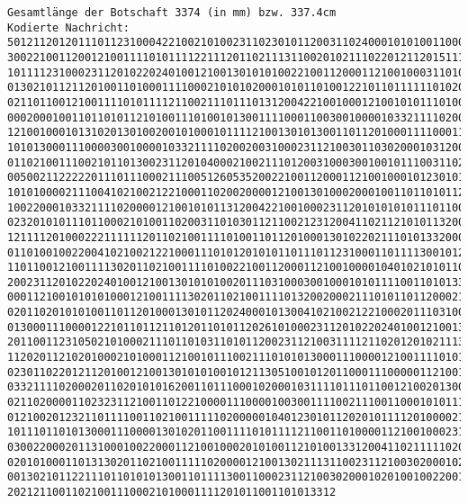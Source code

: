 \documentclass[a4paper,10pt,ngerman]{scrartcl}
\begin{document}
\begin{enumerate}
\begin{verbatim}
Gesamtlänge der Botschaft 3374 (in mm) bzw. 337.4cm
Kodierte Nachricht: 501211201201110112310004221002101002311023010112003110240001010100110002010100112101001
300221001120012100111101011112211120110211131100201021110220121120151111201013211111131
101111231000231120102202401001210013010101002210011200011210010003110101110101121102000
013021011211201001101000111100021010102000101011010012210110111111010200004100201121010
021101100121001111010111121100211101110131200422100100012100101011101001002200121001301
000200010011011010112101001110100101300111100011003001000010332111102003200110111130001
121001000101310201301002001010001011112100130101300110112010001111000110011010110121120
101013000111000030010000103321111020020031000231121003011030200010312004300101100200211
011021001110021011013002311201040002100211101200310003001001011100311024000101110030310
005002112222201110111000211100512605352002210011200011210010001012301012021102000012110
101010000211100410210021221000110200200001210013010002000100110110101121010011011201000
100220001033211110200001210010101131200422100100023112010101010111011001301040001020010
023201010111011000210100110200311010301121100212312004110211210101132001010111122111201
121111201000222111111201102100111101001101120100013010220211101013320002111000110101122
011010010022004102100212210001110101201010110111011231000110111130010121122220212020101
110110012100111130201102100111101002210011200011210010000104010210101101011112010001002
200231120102202401001210013010101002011103100030010001010111100110101331200411112100201
000112100101010100012100111130201102100111101320020002111010110112000211101033211110200
020110201010100110112010001301011202400010130041021002122100020111031000300100021110101
013000111000012210110112110120110101120261010002311201022024010012100130101013120044100
201100112310502101000211101101031101011200231121003111121102012010211131100110200311100
112020112102010002101000112100101110021110101013000111000012100111101011112211120110010
023011022012112010012100130101010010121130510010120110001110000011210010101010000211101
033211110200020110201010162001101110001020001031111011101100121002013002111110011100112
021102000011023231121001101221000011100001003001111002111001100010101111202120112003100
012100201232110111100110210011111020000010401230101120201011112010000210100231120101010
101110110101300011100001301020110011110101111211001101000011210010002311211012011021211
030022000201131000100220001121001000201010011210100133120041102111110200200310320010110
020101000110131302011021001111102000012100130211131100231121003020001020110100110112010
001302101122111011010101300110111130011000231121003020001020100100220012200110101101022
202121100110210011100021010001111201011001101013312
\end{verbatim}


\end{enumerate}
\end{document}
